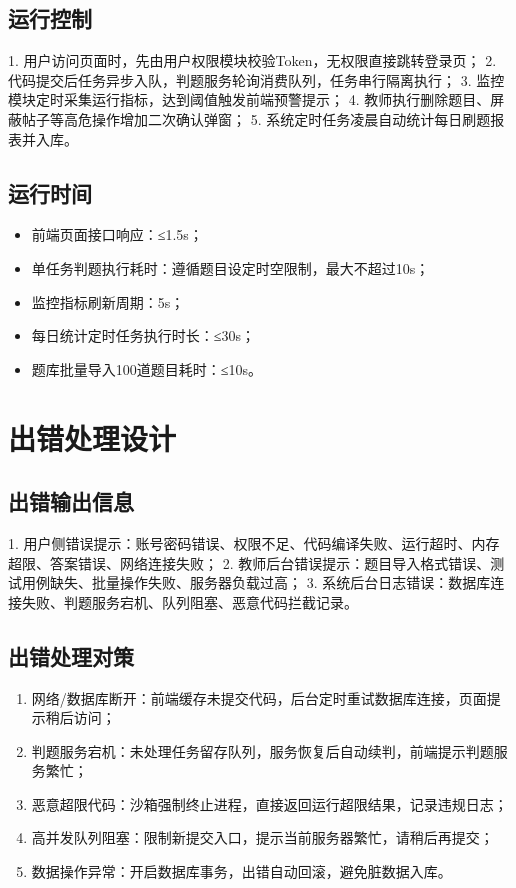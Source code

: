 \documentclass{../template/softeng}
\begin{document}
\subsection{运行控制}
1. 用户访问页面时，先由用户权限模块校验Token，无权限直接跳转登录页；
2. 代码提交后任务异步入队，判题服务轮询消费队列，任务串行隔离执行；
3. 监控模块定时采集运行指标，达到阈值触发前端预警提示；
4. 教师执行删除题目、屏蔽帖子等高危操作增加二次确认弹窗；
5. 系统定时任务凌晨自动统计每日刷题报表并入库。

\subsection{运行时间}
\begin{itemize}
    \item 前端页面接口响应：≤1.5s；
    \item 单任务判题执行耗时：遵循题目设定时空限制，最大不超过10s；
    \item 监控指标刷新周期：5s；
    \item 每日统计定时任务执行时长：≤30s；
    \item 题库批量导入100道题目耗时：≤10s。
\end{itemize}

\section{出错处理设计}
\subsection{出错输出信息}
1. 用户侧错误提示：账号密码错误、权限不足、代码编译失败、运行超时、内存超限、答案错误、网络连接失败；
2. 教师后台错误提示：题目导入格式错误、测试用例缺失、批量操作失败、服务器负载过高；
3. 系统后台日志错误：数据库连接失败、判题服务宕机、队列阻塞、恶意代码拦截记录。

\subsection{出错处理对策}
\begin{enumerate}
    \item 网络/数据库断开：前端缓存未提交代码，后台定时重试数据库连接，页面提示稍后访问；
    \item 判题服务宕机：未处理任务留存队列，服务恢复后自动续判，前端提示判题服务繁忙；
    \item 恶意超限代码：沙箱强制终止进程，直接返回运行超限结果，记录违规日志；
    \item 高并发队列阻塞：限制新提交入口，提示当前服务器繁忙，请稍后再提交；
    \item 数据操作异常：开启数据库事务，出错自动回滚，避免脏数据入库。
\end{enumerate}
\end{document}
